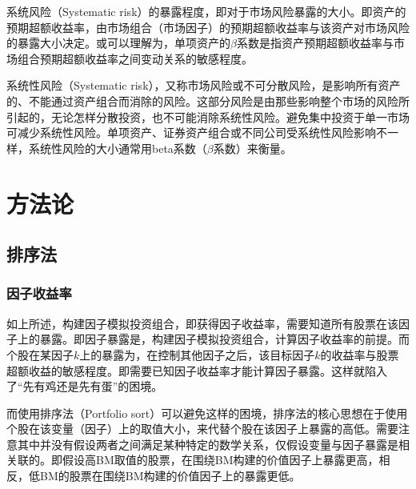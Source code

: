\documentclass[11pt]{article}
\begin{document}
系统风险（Systematic risk）的暴露程度，即对于市场风险暴露的大小。即资产的预期超额收益率，由市场组合（市场因子）的预期超额收益率与该资产对市场风险的暴露大小决定。或可以理解为，单项资产的$\beta$系数是指资产预期超额收益率与市场组合预期超额收益率之间变动关系的敏感程度。

系统性风险（Systematic risk），又称市场风险或不可分散风险，是影响所有资产的、不能通过资产组合而消除的风险。这部分风险是由那些影响整个市场的风险所引起的，无论怎样分散投资，也不可能消除系统性风险。避免集中投资于单一市场可减少系统性风险。单项资产、证券资产组合或不同公司受系统性风险影响不一样，系统性风险的大小通常用beta系数（$\beta$系数）来衡量。

\section{方法论}

\subsection{排序法}

\subsubsection{因子收益率}

如上所述，构建因子模拟投资组合，即获得因子收益率，需要知道所有股票在该因子上的暴露。即因子暴露是，构建因子模拟投资组合，计算因子收益率的前提。而个股在某因子$k$上的暴露为，在控制其他因子之后，该目标因子$k$的收益率与股票超额收益的敏感程度。即需要已知因子收益率才能计算因子暴露。这样就陷入了“先有鸡还是先有蛋”的困境。

而使用排序法（Portfolio sort）可以避免这样的困境，排序法的核心思想在于使用个股在该变量（因子）上的取值大小，来代替个股在该因子上暴露的高低。需要注意其中并没有假设两者之间满足某种特定的数学关系，仅假设变量与因子暴露是相关联的。即假设高BM取值的股票，在围绕BM构建的价值因子上暴露更高，相反，低BM的股票在围绕BM构建的价值因子上的暴露更低。
\end{document}
